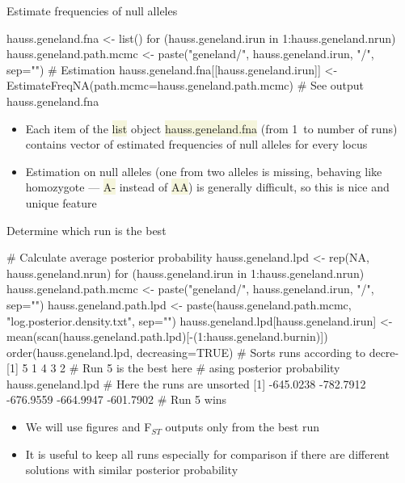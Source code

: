 \documentclass[compress, xelatex, 11pt, xcolor=svgnames, aspectratio=169,
	hyperref={
		bookmarks=true,
		unicode=true,
		colorlinks=true,
		pdftitle={Molecular data in R},
		plainpages=false,
		pdfauthor={Vojtech Zeisek},
		pdfsubject={Course about phylogeny and evolution in R},
		pdfcreator={XeLaTeX},
		pdfkeywords={R, evolution, phylogeny, molecular data},
		linkcolor=Crimson, %
		anchorcolor=Magenta, %
		citecolor=Magenta, %
		filecolor=Magenta, %
		menucolor=Magenta, %
		urlcolor=DodgerBlue, %
		},
	url={hyphens, lowtilde} %
	]{beamer}
\renewcommand{\texttt}[1]{\colorbox{Beige}{{\ttfamily #1}}}
\begin{document}
\begin{frame}[fragile]{Estimate frequencies of null alleles}
	\begin{spluscode}
    hauss.geneland.fna <- list()
    for (hauss.geneland.irun in 1:hauss.geneland.nrun) {
      hauss.geneland.path.mcmc <- paste("geneland/", hauss.geneland.irun,
        "/", sep="")
      # Estimation
      hauss.geneland.fna[[hauss.geneland.irun]] <-
        EstimateFreqNA(path.mcmc=hauss.geneland.path.mcmc)
      }
    # See output
    hauss.geneland.fna
	\end{spluscode}
	\begin{itemize}
		\item Each item of the \texttt{list} object \texttt{hauss.geneland.fna} (from 1~to number of runs) contains vector of estimated frequencies of null alleles for every locus
		\item Estimation on null alleles (one from two alleles is missing, behaving like homozygote --- \texttt{A-} instead of \texttt{AA}) is generally difficult, so this is nice and unique feature
	\end{itemize}
\end{frame}

\begin{frame}[fragile]{Determine which run is the best}
	\begin{spluscode}
    # Calculate average posterior probability
    hauss.geneland.lpd <- rep(NA, hauss.geneland.nrun)
    for (hauss.geneland.irun in 1:hauss.geneland.nrun) {
      hauss.geneland.path.mcmc <- paste("geneland/", hauss.geneland.irun, "/",
        sep="")
      hauss.geneland.path.lpd <- paste(hauss.geneland.path.mcmc,
        "log.posterior.density.txt", sep="")
      hauss.geneland.lpd[hauss.geneland.irun] <-
        mean(scan(hauss.geneland.path.lpd)[-(1:hauss.geneland.burnin)]) }
    order(hauss.geneland.lpd, decreasing=TRUE) # Sorts runs according to decre-
    [1] 5 1 4 3 2 # Run 5 is the best here     # asing posterior probability
    hauss.geneland.lpd # Here the runs are unsorted
    [1] -645.0238 -782.7912 -676.9559 -664.9947 -601.7902 # Run 5 wins
	\end{spluscode}
	\begin{itemize}
		\item We will use figures and F$_{ST}$ outputs only from the best run
		\item It is useful to keep all runs especially for comparison if there are different solutions with similar posterior probability
	\end{itemize}
\end{frame}
\end{document}
